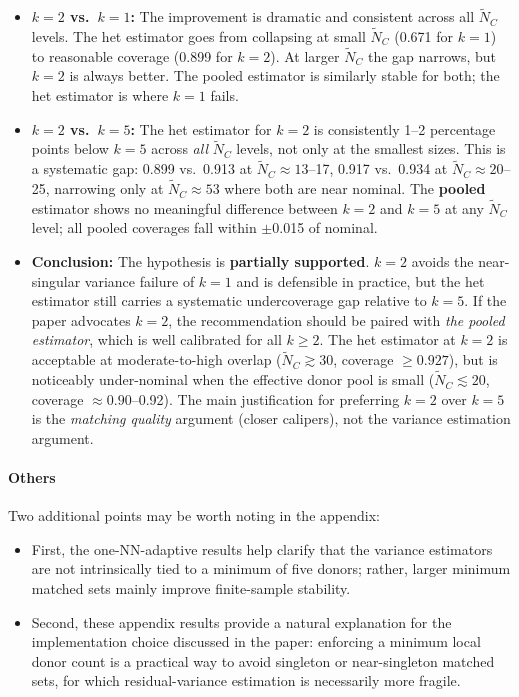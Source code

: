 \documentclass[11pt]{article}
\begin{document}
\begin{itemize}
  \item \textbf{$k=2$ vs.\ $k=1$:} The improvement is dramatic and consistent across all $\tilde{N}_C$ levels.
    The het estimator goes from collapsing at small $\tilde{N}_C$ (0.671 for $k=1$) to reasonable coverage (0.899 for $k=2$).
    At larger $\tilde{N}_C$ the gap narrows, but $k=2$ is always better.
    The pooled estimator is similarly stable for both; the het estimator is where $k=1$ fails.

  \item \textbf{$k=2$ vs.\ $k=5$:} The het estimator for $k=2$ is consistently 1--2 percentage points below $k=5$ across \emph{all} $\tilde{N}_C$ levels, not only at the smallest sizes.
    This is a systematic gap: 0.899 vs.\ 0.913 at $\tilde{N}_C\approx 13$--17, 0.917 vs.\ 0.934 at $\tilde{N}_C\approx 20$--25, narrowing only at $\tilde{N}_C\approx 53$ where both are near nominal.
    The \textbf{pooled} estimator shows no meaningful difference between $k=2$ and $k=5$ at any $\tilde{N}_C$ level; all pooled coverages fall within $\pm$0.015 of nominal.

  \item \textbf{Conclusion:} The hypothesis is \textbf{partially supported}.
    $k=2$ avoids the near-singular variance failure of $k=1$ and is defensible in practice, but the het estimator still carries a systematic undercoverage gap relative to $k=5$.
    If the paper advocates $k=2$, the recommendation should be paired with \emph{the pooled estimator}, which is well calibrated for all $k \geq 2$.
    The het estimator at $k=2$ is acceptable at moderate-to-high overlap ($\tilde{N}_C \gtrsim 30$, coverage $\geq 0.927$), but is noticeably under-nominal when the effective donor pool is small ($\tilde{N}_C \lesssim 20$, coverage $\approx 0.90$--0.92).
    The main justification for preferring $k=2$ over $k=5$ is the \emph{matching quality} argument (closer calipers), not the variance estimation argument.
\end{itemize}

\paragraph{Others}
Two additional points may be worth noting in the appendix:
\begin{itemize}
    \item First, the one-NN-adaptive results help clarify that the variance estimators are not intrinsically tied to a minimum of five donors; rather, larger minimum matched sets mainly improve finite-sample stability.
    \item Second, these appendix results provide a natural explanation for the implementation choice discussed in the paper: enforcing a minimum local donor count is a practical way to avoid singleton or near-singleton matched sets, for which residual-variance estimation is necessarily more fragile.
\end{itemize}
\end{document}
